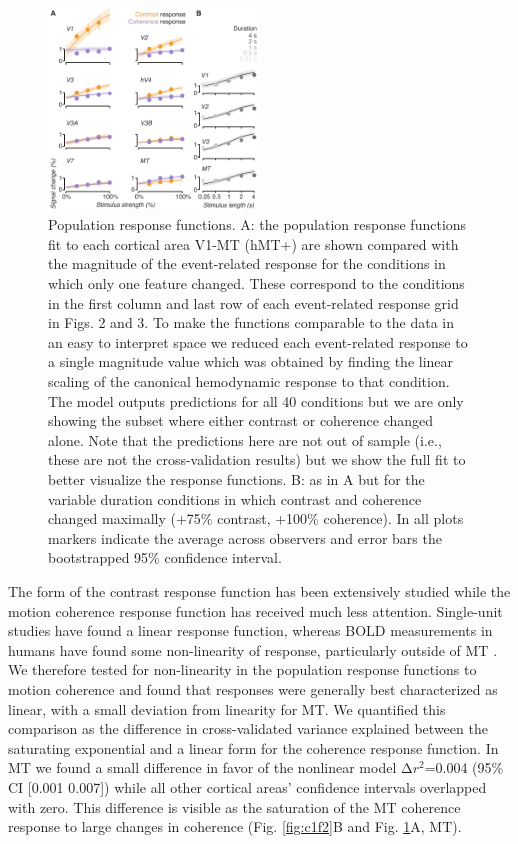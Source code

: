 \documentclass{report}
\begin{document}
\begin{figure}
\centering
\includegraphics[keepaspectratio,width=0.5\textwidth]{figs_c1/Fig5_fit.pdf}
\caption[Population response functions.]{Population response functions. A: the population response functions fit to each cortical area V1-MT (hMT+) are shown compared with the magnitude of the event-related response for the conditions in which only one feature changed. These correspond to the conditions in the first column and last row of each event-related response grid in Figs. 2 and 3. To make the functions comparable to the data in an easy to interpret space we reduced each event-related response to a single magnitude value which was obtained by finding the linear scaling of the canonical hemodynamic response to that condition. The model outputs predictions for all 40 conditions but we are only showing the subset where either contrast or coherence changed alone. Note that the predictions here are not out of sample (i.e., these are not the cross-validation results) but we show the full fit to better visualize the response functions. B: as in A but for the variable duration conditions in which contrast and coherence changed maximally (+75\% contrast, +100\% coherence). In all plots markers indicate the average across observers and error bars the bootstrapped 95\% confidence interval.}
\label{fig:c1f5}
\end{figure}


The form of the contrast response function has been extensively studied \citep{Albrecht1982-rq,Boynton1999-jd,Sclar1990-lk} while the motion coherence response function has received much less attention. Single-unit studies have found a linear response function, whereas BOLD measurements in humans have found some non-linearity of response, particularly outside of MT \citep{Rees2000-ul}. We therefore tested for non-linearity in the population response functions to motion coherence and found that responses were generally best characterized as linear, with a small deviation from linearity for MT. We quantified this comparison as the difference in cross-validated variance explained between the saturating exponential and a linear form for the coherence response function. In MT we found a small difference in favor of the nonlinear model Δ$r^2$=0.004 (95\% CI [0.001 0.007]) while all other cortical areas’ confidence intervals overlapped with zero. This difference is visible as the saturation of the MT coherence response to large changes in coherence (Fig. \ref{fig:c1f2}B and Fig. \ref{fig:c1f5}A, MT).
\end{document}
